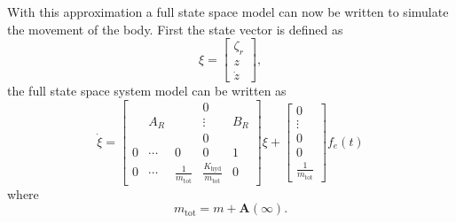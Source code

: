 \documentclass[12pt]{article}
\begin{document}
With this approximation a full state space model can now be written to simulate the movement of the body. First the state vector is defined as
\[
	\xi = \begin{bmatrix}
		\zeta_r \\
		z \\
		\dot{z}
	\end{bmatrix},
\]
the full state space system model can be written as
\[
\dot{\xi} = 
\begin{bmatrix}
	 & & & 0 &  \\
	& A_R & & \vdots & B_R \\
	 & & & 0 &  \\
	 0 & \cdots & 0 & 0 & 1 \\
	 0 & \cdots & \frac{1}{m_{\text{tot}} } & \frac{K_{\text{hyd}}}{m_{\text{tot}} } & 0
\end{bmatrix}
\xi
+ 
\begin{bmatrix}
	0 \\
	\vdots \\
	0 \\
	0 \\
	\frac{1}{m_{\text{tot}} }
\end{bmatrix}
f_e(t)
\]
where
\[
	m_{\text{tot}} = m + \mathbf{A}(\infty).
\]
\end{document}
